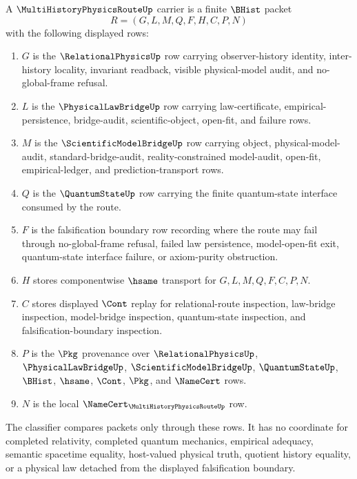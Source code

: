 \begin{definition}
\label{def:multi-history-physics-route-carrier}
A $\MultiHistoryPhysicsRouteUp$ carrier is a finite $\BHist$ packet
$$
R=(G,L,M,Q,F,H,C,P,N)
$$
with the following displayed rows:
\begin{enumerate}
\item $G$ is the $\RelationalPhysicsUp$ row carrying observer-history identity, inter-history locality, invariant readback, visible physical-model audit, and no-global-frame refusal.
\item $L$ is the $\PhysicalLawBridgeUp$ row carrying law-certificate, empirical-persistence, bridge-audit, scientific-object, open-fit, and failure rows.
\item $M$ is the $\ScientificModelBridgeUp$ row carrying object, physical-model-audit, standard-bridge-audit, reality-constrained model-audit, open-fit, empirical-ledger, and prediction-transport rows.
\item $Q$ is the $\QuantumStateUp$ row carrying the finite quantum-state interface consumed by the route.
\item $F$ is the falsification boundary row recording where the route may fail through no-global-frame refusal, failed law persistence, model-open-fit exit, quantum-state interface failure, or axiom-purity obstruction.
\item $H$ stores componentwise $\hsame$ transport for $G,L,M,Q,F,C,P,N$.
\item $C$ stores displayed $\Cont$ replay for relational-route inspection, law-bridge inspection, model-bridge inspection, quantum-state inspection, and falsification-boundary inspection.
\item $P$ is the $\Pkg$ provenance over $\RelationalPhysicsUp$, $\PhysicalLawBridgeUp$, $\ScientificModelBridgeUp$, $\QuantumStateUp$, $\BHist$, $\hsame$, $\Cont$, $\Pkg$, and $\NameCert$ rows.
\item $N$ is the local $\NameCert_{\MultiHistoryPhysicsRouteUp}$ row.
\end{enumerate}
The classifier compares packets only through these rows. It has no coordinate for completed relativity, completed quantum mechanics, empirical adequacy, semantic spacetime equality, host-valued physical truth, quotient history equality, or a physical law detached from the displayed falsification boundary.
\end{definition}

